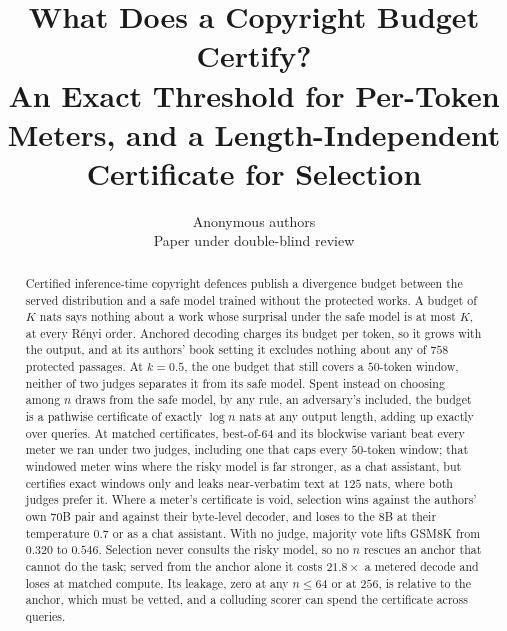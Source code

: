 \documentclass{article}
\title{What Does a Copyright Budget Certify?\\
An Exact Threshold for Per-Token Meters, and a Length-Independent Certificate for Selection}
\author{Anonymous authors\\Paper under double-blind review}
\begin{document}
\maketitle

\begin{abstract}
Certified inference-time copyright defences publish a divergence budget between the served distribution
and a safe model trained without the protected works. A budget of $K$ nats says nothing about a work whose
surprisal under the safe model is at most $K$, at every R\'enyi order. Anchored decoding charges its budget
per token, so it grows with the output, and at its authors' book setting it excludes nothing about any of
$758$ protected passages. At $k=0.5$, the one budget that still covers a $50$-token window, neither of two
judges separates it from its safe model. Spent instead on choosing among $n$ draws from the safe model, by
any rule, an adversary's included, the budget is a pathwise certificate of exactly $\log n$ nats at any
output length, adding up exactly over queries. At matched certificates, best-of-$64$ and its blockwise
variant beat every meter we ran under two judges, including one that caps every $50$-token window; that
windowed meter wins where the risky model is far stronger, as a chat assistant, but certifies exact windows
only and leaks near-verbatim text at $125$ nats, where both judges prefer it. Where a meter's certificate
is void, selection wins against the authors' own $70$B pair and against their byte-level decoder, and
loses to the $8$B at their temperature $0.7$ or as a chat assistant. With no judge, majority vote lifts
GSM8K from $0.320$ to $0.546$. Selection never consults the risky model, so no $n$ rescues an anchor that
cannot do the task; served from the anchor alone it costs $21.8\times$ a metered decode and loses at
matched compute. Its leakage, zero at any $n \le 64$ or at $256$, is relative to the anchor, which must be
vetted, and a colluding scorer can spend the certificate across queries.
\end{abstract}












\end{document}
